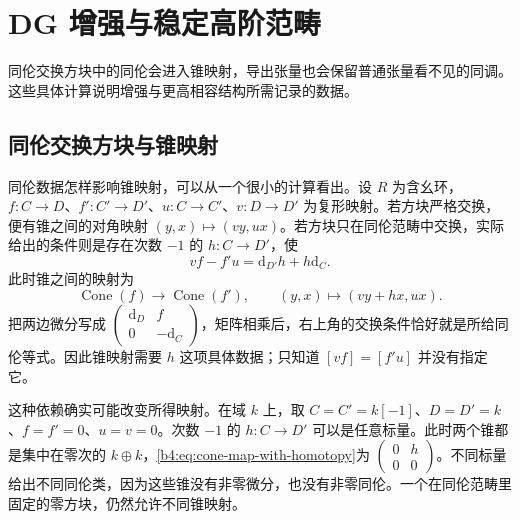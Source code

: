 
\section{DG 增强与稳定高阶范畴}
\label{b4:sec:2004}

同伦交换方块中的同伦会进入锥映射，导出张量也会保留普通张量看不见的同调。这些具体计算说明增强与更高相容结构所需记录的数据。


%
%
%

\subsection{同伦交换方块与锥映射}
\label{b4:subsec:2004:01}

同伦数据怎样影响锥映射，可以从一个很小的计算看出。设 \(R\) 为含幺环，\(f:C\to D\)、\(f':C'\to D'\)、\(u:C\to C'\)、\(v:D\to D'\) 为复形映射。若方块严格交换，便有锥之间的对角映射 \((y,x)\mapsto(vy,ux)\)。若方块只在同伦范畴中交换，实际给出的条件则是存在次数 \(-1\) 的 \(h:C\to D'\)，使
\[
	vf-f'u=\mathrm{d}_{D'}h+h\mathrm{d}_C.
\]
此时锥之间的映射为
\begin{equation}\label{b4:eq:cone-map-with-homotopy}
	\operatorname{Cone}(f)\longrightarrow\operatorname{Cone}(f'), \qquad (y,x)\longmapsto(vy+hx,ux).
\end{equation}
把两边微分写成 \(\left(\begin{smallmatrix}\mathrm{d}_D&f\\0&-\mathrm{d}_C\end{smallmatrix}\right)\)，矩阵相乘后，右上角的交换条件恰好就是所给同伦等式。因此锥映射需要 \(h\) 这项具体数据；只知道 \([vf]=[f'u]\) 并没有指定它。

\ProseParagraphBreak
这种依赖确实可能改变所得映射。在域 \(k\) 上，取 \(C=C'=k[-1]\)、\(D=D'=k\)、\(f=f'=0\)、\(u=v=0\)。次数 \(-1\) 的 \(h:C\to D'\) 可以是任意标量。此时两个锥都是集中在零次的 \(k\oplus k\)，\eqref{b4:eq:cone-map-with-homotopy}为 \(\left(\begin{smallmatrix}0&h\\0&0\end{smallmatrix}\right)\)。不同标量给出不同同伦类，因为这些锥没有非零微分，也没有非零同伦。一个在同伦范畴里固定的零方块，仍然允许不同锥映射。

